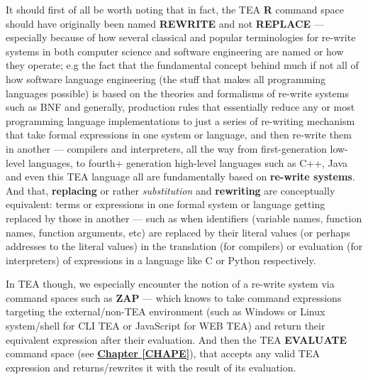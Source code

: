 \documentclass[a4paper, 18pt]{book} %
\begin{document}
{{{It should first of all be worth noting that in fact, the TEA \textbf{R} command space should have originally been named \textbf{REWRITE} and not \textbf{REPLACE} --- especially because of how several classical and popular terminologies for re-write systems in both computer science and software engineering are named or how they operate; e.g the fact that the fundamental concept behind much if not all of how software language engineering (the stuff that makes all programming languages possible) is based on the theories and formalisms of re-write systems such as BNF and generally, production rules that essentially reduce any or most programming language implementations to just a series of re-writing mechanism that take formal expressions in one system or language, and then re-write them in another --- compilers and interpreters, all the way from first-generation low-level languages, to fourth+ generation high-level languages such as C++, Java and even this TEA language all are fundamentally based on \textbf{re-write systems}. And that, \textbf{replacing} or rather \textit{substitution} and \textbf{rewriting} are conceptually equivalent: terms or expressions in one formal system or language getting replaced by those in another --- such as when identifiers (variable names, function names, function arguments, etc) are replaced by their literal values (or perhaps addresses to the literal values) in the translation (for compilers) or evaluation (for interpreters) of expressions in a language like C or Python respectively.

\vspace{2em}

In TEA though, we especially encounter the notion of a re-write system via command spaces such as \textbf{ZAP} --- which knows to take command expressions targeting the external/non-TEA environment (such as Windows or Linux system/shell for CLI TEA or JavaScript for WEB TEA) and return their equivalent expression after their evaluation. And then the TEA \textbf{EVALUATE} command space (see \textbf{\hyperref[CHAPE]{Chapter \ref{CHAPE}}}), that accepts any valid TEA expression and returns/rewrites it with the result of its evaluation.

\vspace{2em}

}}}
\end{document}

